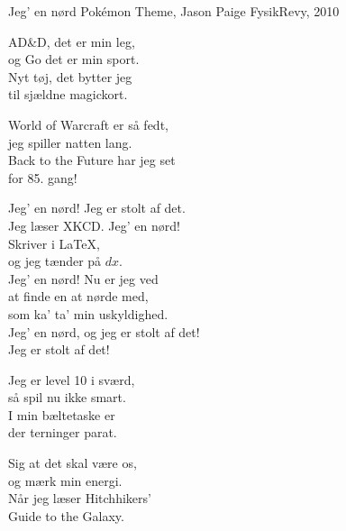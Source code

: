 \begin{song}{Jeg' en nørd}
  {} %
  {Pokémon Theme, Jason Paige} %
  {} %
  {FysikRevy, 2010} %
  {\NotCCLIed} %

  \begin{SBVerse}
    AD\&D, det er min leg,\\
    og Go det er min sport.\\
    Nyt tøj, det bytter jeg\\
    til sjældne magickort.
  \end{SBVerse}

  \begin{SBVerse}
    World of Warcraft er så fedt,\\
    jeg spiller natten lang.\\
    Back to the Future har jeg set\\
    for 85. gang!
  \end{SBVerse}

  \begin{SBChorus}
    Jeg' en nørd! Jeg er stolt af det.\\
    Jeg læser XKCD. Jeg' en nørd!\\
    Skriver i \LaTeX,\\
    og jeg tænder på $dx$.\\\medskip
    Jeg' en nørd! Nu er jeg ved\\
    at finde en at nørde med,\\
    som ka’ ta’ min uskyldighed.\\
    Jeg' en nørd, og jeg er stolt af det!\\\medskip
    Jeg er stolt af det!
  \end{SBChorus}

  \begin{SBVerse}
    Jeg er level 10 i sværd,\\
    så spil nu ikke smart.\\
    I min bæltetaske er\\
    der terninger parat.
  \end{SBVerse}

  \begin{SBVerse}
    Sig at det skal være os,\\
    og mærk min energi.\\
    Når jeg læser Hitchhikers’\\
    Guide to the Galaxy.
  \end{SBVerse}


\end{song}

